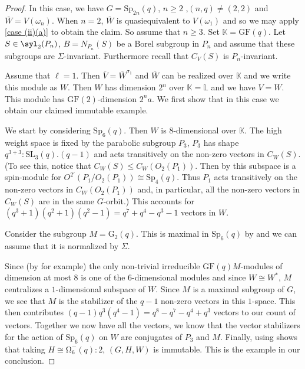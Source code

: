 \documentclass[12pt]{amsart}
\theoremstyle{remark}
\theoremstyle{notation}
\theoremstyle{definition}
\newcommand{\G}{\mathrm{G}}
\newcommand{\GF}{\mathrm{GF}}
\newcommand{\Sp}{\mathrm{Sp}}
\newcommand{\SL}{\mathrm{SL}}
\newcommand{\0}{\emptyset}
\begin{document}
\begin{proof} In this case, we have $ G=\Sp_{2n}(q)$, $n \ge 2$ ,$(n,q) \ne (2,2)$ and  $\overline W= V(\omega_n)$. When $n=2$,  $\overline W$ is quasiequivalent to $V(\omega_1)$ and so we may apply \cref{case (ii)(a)} to obtain the claim.  So assume that $n \ge 3$. Set  $\mathbb K=\GF(q)$. Let $S \in \syl_2(P_n)$, $B=N_{P_n}(S)$ be a Borel subgroup in $P_n$ and assume that these subgroups are $\Sigma$-invariant. Furthermore recall that $C_V(S)$ is $P_n$-invariant.

Assume that $\ell=1$. Then $\overline V= \overline W^{\sigma_1}$ and $\overline W$ can be realized over $\mathbb K$ and we write this module as $W$. Then $W$ has dimension $2^n$ over $\mathbb K=\mathbb L$ and we have $V=W$. This module  has $\GF(2)$-dimension $2^na$. We first show that in this case we obtain our claimed immutable example.



We start by considering $\Sp_6(q)$. Then $W$ is   $8$-dimensional  over $\mathbb K$. The high weight space is fixed by the parabolic subgroup $P_3$, $P_3$ has shape $q^{3+3}{:}\SL_3(q).(q-1)$ and acts transitively on the non-zero vectors in $C_W(S)$. (To see this, notice that  $C_W(S) \le C_{W}(O_2(P_1))$. Then by \cite[Theorem 6.1]{PR03} this subspace is a spin-module for $O^{2'}(P_1/O_2(P_1)) \cong \Sp_4(q)$. Thus $P_1 $ acts transitively on the non-zero vectors in $C_{W}(O_2(P_1))$ and, in particular,  all the non-zero vectors in $C_W(S)$ are in the same $G$-orbit.) This accounts for $(q^3+1)(q^2+1)(q^2-1)=q^7+q^4-q^3-1$ vectors in $W$.

Consider the   subgroup $M=\G_2(q)$. This is maximal in $\Sp_6(q)$ by \cite[Table 8.29]{BHRoney} and we can assume that it is normalized by $\Sigma$.

Since (by \cite[Theorem 4.4 and Appendix A.49]{Lubeck} for example) the only non-trivial irreducible $\GF(q)M$-modules of dimension at most $8$ is one of the $6$-dimensional modules and since $W \cong W^*$, $M$ centralizes a $1$-dimensional subspace of $W$. Since $M$ is a maximal subgroup of $G$, we see that $M$ is the stabilizer of the $q-1$ non-zero vectors in this $1$-space. This then contributes  $(q-1)q^3(q^4-1)=q^8-q^7-q^4+q^3$ vectors to our count of vectors. Together we now have  all the vectors, we know that the vector stabilizers for the action of $\Sp_6(q)$ on $W$ are conjugates of $P_3$ and $M$. Finally, using \cite[Theorem A, Tables 1 \& 2  ]{LiebeckPraegerSaxl} shows that taking $H \cong \mathrm \Omega_6^-(q){:}2$, $(G,H,W)$ is immutable. This is the example in our conclusion.


\end{proof}
\end{document}
